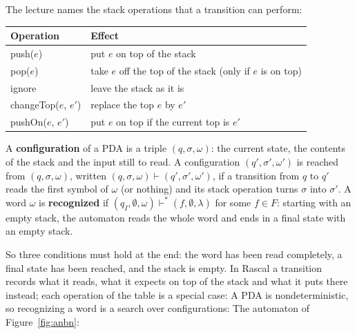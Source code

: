 The lecture names the stack operations that a transition can perform:
\begin{center}
\small
\begin{tabular}{l l}
  \toprule
  Operation & Effect \\
  \midrule
  push($e$)          & put $e$ on top of the stack \\
  pop($e$)           & take $e$ off the top of the stack (only if $e$ is on top) \\
  ignore             & leave the stack as it is \\
  changeTop($e$, $e'$) & replace the top $e$ by $e'$ \\
  pushOn($e$, $e'$)  & put $e$ on top if the current top is $e'$ \\
  \bottomrule
\end{tabular}
\end{center}

\begin{definition}
A \textbf{configuration} of a PDA is a triple $(q, \sigma, \omega)$: the current
state, the contents of the stack and the input still to read. A configuration
$(q', \sigma', \omega')$ is reached from $(q, \sigma, \omega)$, written
$(q, \sigma, \omega) \vdash (q', \sigma', \omega')$, if a transition from $q$ to
$q'$ reads the first symbol of $\omega$ (or nothing) and its stack operation
turns $\sigma$ into $\sigma'$. A word $\omega$ is \textbf{recognized} if
$(q_I, \emptyset, \omega) \vdash^* (f, \emptyset, \lambda)$ for some $f \in F$:
starting with an empty stack, the automaton reads the whole word and ends in
a final state with an empty stack.
\end{definition}

So three conditions must hold at the end: the word has been read completely,
a final state has been reached, and the stack is empty. In Rascal a
transition records what it reads, what it expects on top of the stack and
what it puts there instead; each operation of the table is a special case:
A PDA is nondeterministic, so recognizing a word is a search over
configurations:
The automaton of Figure~\ref{fig:anbn}:

